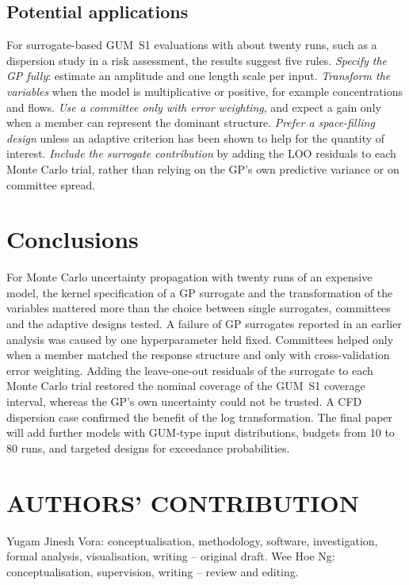 \documentclass{imeko_wc}
\begin{document}
\subsection{Potential applications}
For surrogate-based GUM~S1 evaluations with about twenty runs, such as a
dispersion study in a risk assessment, the results suggest five rules.
\emph{Specify the GP fully}: estimate an amplitude and one length scale per
input. \emph{Transform the variables} when the model is multiplicative or
positive, for example concentrations and flows. \emph{Use a committee only
with error weighting}, and expect a gain only when a member can represent the
dominant structure. \emph{Prefer a space-filling design} unless an adaptive
criterion has been shown to help for the quantity of interest.
\emph{Include the surrogate contribution} by adding the LOO residuals to
each Monte Carlo trial, rather than relying on the GP's own predictive
variance or on committee spread.

\section{Conclusions}
For Monte Carlo uncertainty propagation with twenty runs of an expensive
model, the kernel specification of a GP surrogate and the transformation of
the variables mattered more than the choice between single surrogates,
committees and the adaptive designs tested. A failure of GP surrogates
reported in an earlier analysis was caused by one hyperparameter held fixed.
Committees helped only when a member matched the response structure and only
with cross-validation error weighting. Adding the leave-one-out residuals
of the surrogate to each Monte Carlo trial restored the nominal coverage of
the GUM~S1 coverage interval, whereas the GP's own uncertainty could not be
trusted. A CFD dispersion case confirmed the benefit of the log
transformation. The final paper will add further models with GUM-type input
distributions, budgets from 10 to 80 runs, and targeted designs for
exceedance probabilities.

\section*{AUTHORS' CONTRIBUTION}
Yugam Jinesh Vora: conceptualisation, methodology, software, investigation,
formal analysis, visualisation, writing -- original draft. Wee Hoe Ng:
conceptualisation, supervision, writing -- review and editing.



\end{document}
